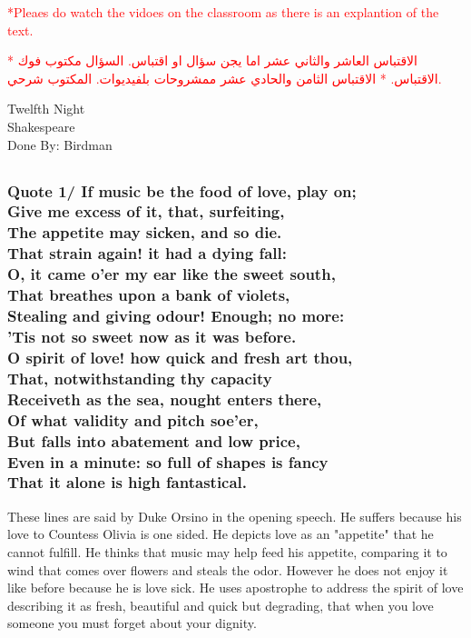 \documentclass[12pt, a4paper]{article}
\begin{document}
\small{\textcolor{red}{*Pleaes do watch the vidoes on the classroom as 
there is an explantion of the text.\smallbreak}}

\begin{otherlanguage}{arabic}
  \textcolor{red}{
* الاقتباس العاشر والثاني عشر اما يجن سؤال او اقتباس. السؤال مكتوب فوك الاقتباس.\smallbreak
* الاقتباس الثامن والحادي عشر ممشروحات بلفيديوات. المكتوب شرحي.
  }
\end{otherlanguage}

\begin{center}
{\fonthead
\huge{Twelfth Night}\\[0.2cm]
\Large{Shakespeare}\\[0.5cm]
\large{Done By: Birdman}\\[1cm]
}
\end{center}





\subsection*{}

\subsubsection*{Quote 1/
  If music be the food of love, play on;\\
	Give me excess of it, that, surfeiting,\\
	The appetite may sicken, and so die.\\
	That strain again! it had a dying fall:\\
	O, it came o'er my ear like the sweet south,\\
	That breathes upon a bank of violets,\\
	Stealing and giving odour! Enough; no more:\\
	'Tis not so sweet now as it was before.\\
	O spirit of love! how quick and fresh art thou,\\
	That, notwithstanding thy capacity	\\
	Receiveth as the sea, nought enters there,\\
	Of what validity and pitch soe'er,\\
	But falls into abatement and low price,\\
	Even in a minute: so full of shapes is fancy\\
	That it alone is high fantastical.
}
These lines are said by Duke Orsino  in the opening speech. He suffers because
his love to Countess Olivia is one sided. He depicts love as an "appetite" that
he cannot fulfill. He thinks that music may help feed his appetite, comparing
it to wind that comes over flowers and steals the odor. However he does not
enjoy it like before because he is love sick. He uses apostrophe to address the spirit of love
describing it as fresh, beautiful and quick but degrading, that when you
love someone you must forget about your dignity.
\end{document}
